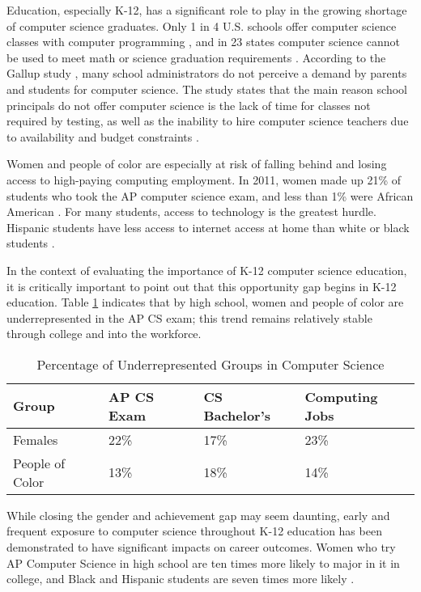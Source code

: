 Education, especially K-12, has a significant role to play in the growing shortage of computer science graduates. Only 1 in 4 U.S. schools offer computer science classes with computer programming \cite{gallup}, and in 23 states computer science cannot be used to meet math or science graduation requirements \cite{WSJref}. According to the Gallup study \cite{gallup}, many school administrators do not perceive a demand by parents and students for computer science. The study states that the main reason school principals do not offer computer science is the lack of time for classes not required by testing, as well as the inability to hire computer science teachers due to availability and budget constraints \cite{gallup}. \par 

Women and people of color are especially at risk of falling behind and losing access to high-paying computing employment. In 2011, women made up 21\% of students who took the AP computer science exam, and less than 1\% were African American \cite{backtoschool}. For many students, access to technology is the greatest hurdle. Hispanic students have less access to internet access at home than white or black students \cite{gallup}. \par
In the context of evaluating the importance of K-12 computer science education, it is critically important to point out that this opportunity gap begins in K-12 education. Table \ref{tab:csgap} indicates that by high school, women and people of color are underrepresented in the AP CS exam; this trend remains relatively stable through college and into the workforce. \par
\begin{table}
	\centering
		\begin{tabular}{ | l | p{3cm}|p{3cm}|p{3cm}| } \hline
			\textbf{Group} & \textbf{AP CS Exam} & \textbf{CS Bachelor’s} & \textbf{Computing Jobs} \\ \hline
			Females & 22\% & 17\% & 23\% \\ \hline
			People of Color & 13\% & 18\% & 14\% \\ \hline
		\end{tabular}
		\caption{Percentage of Underrepresented Groups in Computer Science \cite{codeorgstats}} \label{tab:csgap} 
\end{table} 
			
While closing the gender and achievement gap may seem daunting, early and frequent exposure to computer science throughout K-12 education has been demonstrated to have significant impacts on career outcomes. Women who try AP Computer Science in high school are ten times more likely to major in it in college, and Black and Hispanic students are seven times more likely \cite{apfive}. \par


